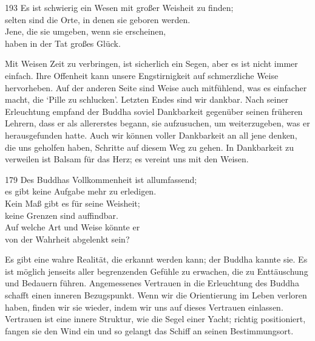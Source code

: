 
\begin{dhpVerse}{193}
\label{dhp-193}
Es ist schwierig ein Wesen mit großer Weisheit zu finden;\\ 
selten sind die Orte, in denen sie geboren werden.\\ 
Jene, die sie umgeben, wenn sie erscheinen,\\ 
haben in der Tat großes Glück. 
\end{dhpVerse}

\begin{dhpRefl}

Mit Weisen Zeit zu verbringen, ist sicherlich ein Segen, aber es ist nicht
immer einfach. Ihre Offenheit kann unsere Engstirnigkeit auf schmerzliche
Weise hervorheben. Auf der anderen Seite sind Weise auch mitfühlend, was es
einfacher macht, die `Pille zu schlucken'. Letzten Endes sind wir dankbar.
Nach seiner Erleuchtung empfand der Buddha soviel Dankbarkeit gegenüber seinen
früheren Lehrern, dass er als allererstes begann, sie aufzusuchen, um
weiterzugeben, was er herausgefunden hatte. Auch wir können voller Dankbarkeit
an all jene denken, die uns geholfen haben, Schritte auf diesem Weg zu gehen.
In Dankbarkeit zu verweilen ist Balsam für das Herz; es vereint uns mit den
Weisen.

\end{dhpRefl}


\begin{dhpVerse}{179}
\label{dhp-179}
Des Buddhas Vollkommenheit ist allumfassend;\\ 
es gibt keine Aufgabe mehr zu erledigen.\\ 
Kein Maß gibt es für seine Weisheit;\\ 
keine Grenzen sind auffindbar.\\ 
Auf welche Art und Weise könnte er\\ 
von der Wahrheit abgelenkt sein? 
\end{dhpVerse}

\begin{dhpRefl}

Es gibt eine wahre Realität, die erkannt werden kann; der Buddha kannte sie.
Es ist möglich jenseits aller begrenzenden Gefühle zu erwachen, die zu
Enttäuschung und Bedauern führen. Angemessenes Vertrauen in die Erleuchtung
des Buddha schafft einen inneren Bezugspunkt. Wenn wir die Orientierung im
Leben verloren haben, finden wir sie wieder, indem wir uns auf dieses
Vertrauen einlassen. Vertrauen ist eine innere Struktur, wie die Segel einer
Yacht; richtig positioniert, fangen sie den Wind ein und so gelangt das Schiff
an seinen Bestimmungsort.

\end{dhpRefl}

